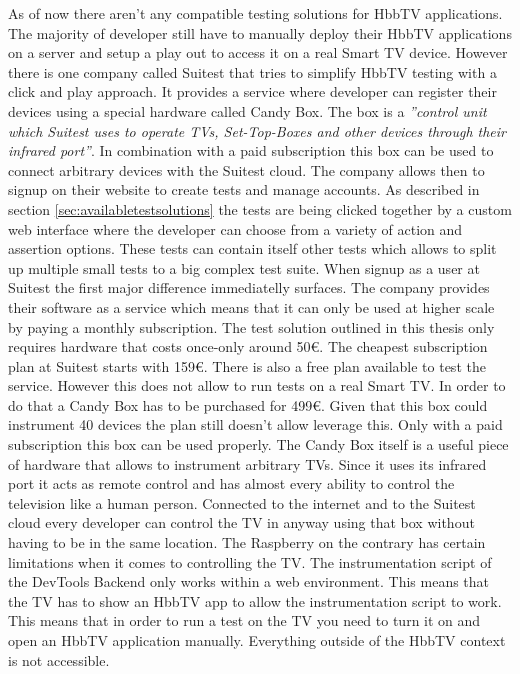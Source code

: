 As of now there aren't any compatible testing solutions for HbbTV applications. The majority of developer still have
to manually deploy their HbbTV applications on a server and setup a play out to access it on a real Smart TV device.
However there is one company called Suitest that tries to simplify HbbTV testing with a click and play approach.
It provides a service where developer can register their devices using a special hardware called Candy Box. The box
is a \textit{''control unit which Suitest uses to operate TVs, Set-Top-Boxes and other devices through their infrared
port''}\cite{candybox}. In combination with a paid subscription this box can be used to connect arbitrary devices
with the Suitest cloud. The company allows then to signup on their website to create tests and manage accounts.
As described in section \ref{sec:availabletestsolutions} the tests are being clicked together by a custom web interface
where the developer can choose from a variety of action and assertion options. These tests can contain itself other
tests which allows to split up multiple small tests to a big complex test suite.
When signup as a user at Suitest the first major difference immediatelly surfaces. The company provides their software
as a service which means that it can only be used at higher scale by paying a monthly subscription. The test solution
outlined in this thesis only requires hardware that costs once-only around 50\euro. The cheapest subscription plan
at Suitest starts with 159\euro. There is also a free plan available to test the service. However this does not allow
to run tests on a real Smart TV. In order to do that a Candy Box has to be purchased for 499\euro. Given that this
box could instrument 40 devices the plan still doesn't allow leverage this. Only with a paid subscription this box
can be used properly.
The Candy Box itself is a useful piece of hardware that allows to instrument arbitrary TVs. Since it uses its infrared
port it acts as remote control and has almost every ability to control the television like a human person. Connected
to the internet and to the Suitest cloud every developer can control the TV in anyway using that box without having
to be in the same location. The Raspberry on the contrary has certain limitations when it comes to controlling the TV.
The instrumentation script of the DevTools Backend only works within a web environment. This means that the TV has to
show an HbbTV app to allow the instrumentation script to work. This means that in order to run a test on the TV you
need to turn it on and open an HbbTV application manually. Everything outside of the HbbTV context is not accessible.
